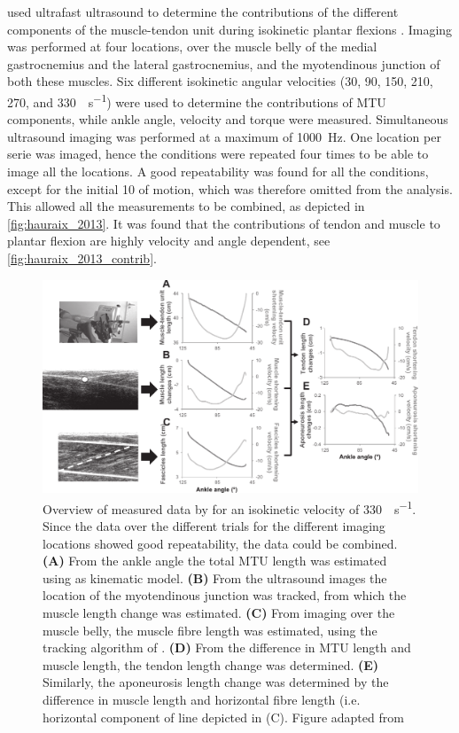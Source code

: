 \citeauthor{hauraix_shortening_2013} used ultrafast ultrasound to determine the contributions of the different components of the muscle-tendon unit during isokinetic plantar flexions \cite{hauraix_shortening_2013}. Imaging was performed at four locations, over the muscle belly of the medial gastrocnemius and the lateral gastrocnemius, and the myotendinous junction of both these muscles. Six different isokinetic angular velocities (30, 90, 150, 210, 270, and \SI{330}{\deg\per\second}) were used to determine the contributions of MTU components, while ankle angle, velocity and torque were measured. Simultaneous ultrasound imaging was performed at a maximum of \SI{1000}{\hertz}. One location per serie was imaged, hence the conditions were repeated four times to be able to image all the locations. A good repeatability was found for all the conditions, except for the initial \SI{10}{\deg} of motion, which was therefore omitted from the analysis. This allowed all the measurements to be combined, as depicted in \autoref{fig:hauraix_2013}. It was found that the contributions of tendon and muscle to plantar flexion are highly velocity and angle dependent, see \autoref{fig:hauraix_2013_contrib}. 


	\begin{figure}[!t]
		\centering
		\includegraphics[width=\linewidth]{Figures/mtu_imaging/hauraix_2013_mtu_velocity.pdf}
		\caption{Overview of measured data by \citeauthor{hauraix_shortening_2013} for an isokinetic velocity of \SI{330}{\deg\per\second}. Since the data over the different trials for the different imaging locations showed good repeatability, the data could be combined. \textbf{(A)} From the ankle angle the total MTU length was estimated using as kinematic model. \textbf{(B)} From the ultrasound images the location of the myotendinous junction was tracked, from which the muscle length change was estimated. \textbf{(C)} From imaging over the muscle belly, the muscle fibre length was estimated, using the tracking algorithm of \citet{cronin_automatic_2011}. \textbf{(D)} From the difference in MTU length and muscle length, the tendon length change was determined. \textbf{(E)} Similarly, the aponeurosis length change was determined by the difference in muscle length and horizontal fibre length (i.e. horizontal component of line depicted in (C). Figure adapted from \citet{hauraix_shortening_2013}}
		\label{fig:hauraix_2013}
	\end{figure}
	
